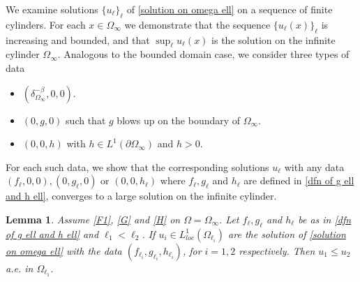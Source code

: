 \documentclass{amsart}
\newtheorem{lemma}[theorem]{Lemma}
\newcommand{\ul}{u_{\ell}}
\begin{document}
We examine solutions $\{\ul\}_{\ell}$ of \eqref{solution on omega ell} on a sequence of finite cylinders. For each $x\in \Omega_{\infty}$ we demonstrate that the sequence $\{\ul(x)\}_{\ell}$ is increasing and bounded, and that $\sup_{\ell}\ul(x)$ is the solution on the infinite cylinder $\Omega_{\infty}$. 
Analogous to the bounded domain case, we consider three types of data
\begin{itemize}
    \item $(\delta_{\Omega_{\infty}}^{-\beta},0,0)$.
    \item $(0,g,0)$ such that $g$ blows up on the boundary of $\Omega_{\infty}$.
    \item $(0,0,h)$ with $h\in  L^{1}(\partial\Omega_{\infty})$ and $h>0$.
\end{itemize}
For each such data, we show that the corresponding solutions $\ul$ with any data $(f_{\ell},0,0),(0,g_{\ell},0)$ or $(0,0,h_{\ell})$ where $f_{\ell},g_{\ell}$ and $h_{\ell}$ are defined in \eqref{dfn of g ell and h ell}, converges to a large solution on the infinite cylinder.
\begin{lemma}\label{comparing u ell}
     Assume \ref{F1}, \ref{G} and \ref{H} on $\Omega=\Omega_{\infty}$. Let $f_{\ell},g_{\ell}$ and $h_{\ell}$ be as in \eqref{dfn of g ell and h ell} and $\ell_{1}<\ell_{2}$. If $u_{i}\in L^{1}_{loc}(\Omega_{\ell_{i}})$ are the solution of \eqref{solution on omega ell} with the data $(f_{\ell_{i}},g_{\ell_{i}},h_{\ell_{i}})$, for $i=1,2$ respectively. Then $u_{1}\leq u_{2}$ a.e. in $\Omega_{\ell_{1}}$.
\end{lemma}
\end{document}
